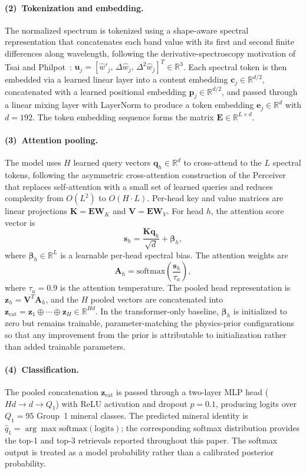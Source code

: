 \documentclass[11pt]{article}
\newcommand{\R}{\mathbb{R}}
\begin{document}
\paragraph{(2)~Tokenization and embedding.}
The normalized spectrum is tokenized using a shape-aware spectral representation that concatenates each band value with its first and second finite differences along wavelength, following the derivative-spectroscopy motivation of Tsai and Philpot~\cite{tsai1998derivative}: $\mathbf{u}_j = [\hat{w}'_j,\, \Delta\hat{w}_j,\, \Delta^2\hat{w}_j]^T \in \R^{3}$.
Each spectral token is then embedded via a learned linear layer into a content embedding $\mathbf{c}_j \in \R^{d/2}$, concatenated with a learned positional embedding $\mathbf{p}_j \in \R^{d/2}$, and passed through a linear mixing layer with LayerNorm to produce a token embedding $\mathbf{e}_j \in \R^{d}$ with $d = 192$.
The token embedding sequence forms the matrix $\mathbf{E} \in \R^{L \times d}$.

\paragraph{(3)~Attention pooling.}
The model uses $H$ learned query vectors $\mathbf{q}_h \in \R^{d}$ to cross-attend to the $L$ spectral tokens, following the asymmetric cross-attention construction of the Perceiver~\cite{jaegle2021perceiver} that replaces self-attention with a small set of learned queries and reduces complexity from $O(L^2)$ to $O(H \cdot L)$.
Per-head key and value matrices are linear projections $\mathbf{K} = \mathbf{E}\mathbf{W}_K$ and $\mathbf{V} = \mathbf{E}\mathbf{W}_V$.
For head $h$, the attention score vector is
\[
\mathbf{s}_h = \frac{\mathbf{K}\mathbf{q}_h}{\sqrt{d}} + \bm{\beta}_h,
\]
where $\bm{\beta}_h \in \R^{L}$ is a learnable per-head spectral bias.
The attention weights are
\[
\mathbf{A}_h = \mathrm{softmax}\left(\frac{\mathbf{s}_h}{\tau_a}\right),
\]
where $\tau_a = 0.9$ is the attention temperature.
The pooled head representation is $\mathbf{z}_h = \mathbf{V}^{T}\mathbf{A}_h$, and the $H$ pooled vectors are concatenated into $\mathbf{z}_{\text{cat}} = \mathbf{z}_1 \oplus \cdots \oplus \mathbf{z}_H \in \R^{Hd}$.
In the transformer-only baseline, $\bm{\beta}_h$ is initialized to zero but remains trainable, parameter-matching the physics-prior configurations so that any improvement from the prior is attributable to initialization rather than added trainable parameters.

\paragraph{(4)~Classification.}
The pooled concatenation $\mathbf{z}_{\text{cat}}$ is passed through a two-layer MLP head ($Hd \to d \to Q_1$) with ReLU activation and dropout $p = 0.1$, producing logits over $Q_1 = 95$ Group~1 mineral classes.
The predicted mineral identity is $\hat{q}_1 = \arg\max \mathrm{softmax}(\mathrm{logits})$; the corresponding softmax distribution provides the top-1 and top-3 retrievals reported throughout this paper.
The softmax output is treated as a model probability rather than a calibrated posterior probability.
\end{document}
